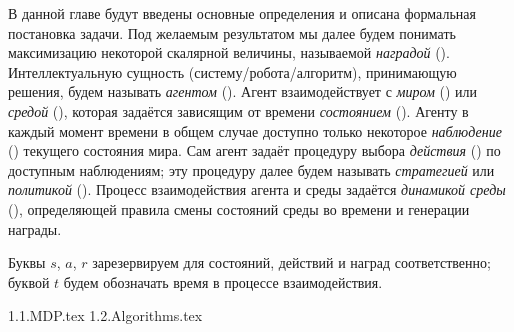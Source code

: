 \documentclass[../main.tex]{subfiles}
\begin{document}
В данной главе будут введены основные определения и описана формальная постановка задачи. Под желаемым результатом мы далее будем понимать максимизацию некоторой скалярной величины, называемой \emph{наградой} (). Интеллектуальную сущность (систему/робота/алгоритм), принимающую решения, будем называть \emph{агентом} (). Агент взаимодействует с \emph{миром} () или \emph{средой} (), которая задаётся зависящим от времени \emph{состоянием} (). Агенту в каждый момент времени в общем случае доступно только некоторое \emph{наблюдение} () текущего состояния мира. Сам агент задаёт процедуру выбора \emph{действия} () по доступным наблюдениям; эту процедуру далее будем называть \emph{стратегией} или \emph{политикой} (). Процесс взаимодействия агента и среды задаётся \emph{динамикой среды} (), определяющей правила смены состояний среды во времени и генерации награды.

Буквы $s$, $a$, $r$ зарезервируем для состояний, действий и наград соответственно; буквой $t$ будем обозначать время в процессе взаимодействия. 

{1.1.MDP.tex}
{1.2.Algorithms.tex}
\end{document}
